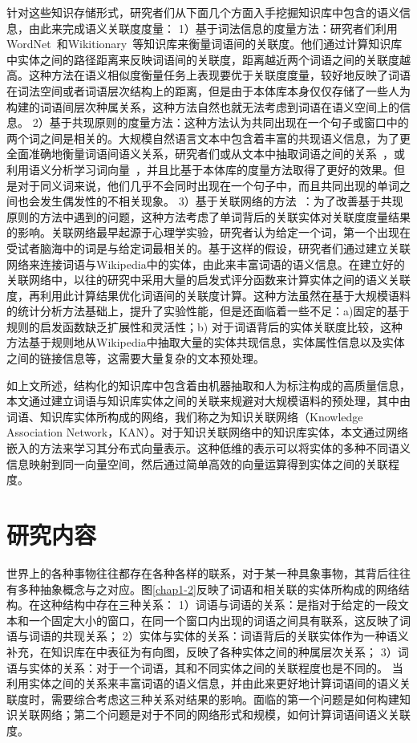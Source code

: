 针对这些知识存储形式，研究者们从下面几个方面入手挖掘知识库中包含的语义信息，由此来完成语义关联度度量：
%
1）基于词法信息的度量方法：研究者们利用WordNet~\cite{acl/Pucher07, tkde/ZhuI17}和Wikitionary~\cite{aaai/ZeschMG08}等知识库来衡量词语间的关联度。他们通过计算知识库中实体之间的路径距离来反映词语间的关联度，距离越近两个词语之间的关联度越高。这种方法在语义相似度衡量任务上表现要优于关联度度量，较好地反映了词语在词法空间或者词语层次结构上的距离，但是由于本体库本身仅仅存储了一些人为构建的词语间层次种属关系，这种方法自然也就无法考虑到词语在语义空间上的信息。
%
2）基于共现原则的度量方法：这种方法认为共同出现在一个句子或窗口中的两个词之间是相关的。大规模自然语言文本中包含着丰富的共现语义信息，为了更全面准确地衡量词语间语义关系，研究者们或从文本中抽取词语之间的关系~\cite{aaai/Milne08}，或利用语义分析学习词向量~\cite{ijcai/GabrilovichM07, corr/Mikolov13, emnlp/PenningtonSM14}，并且比基于本体库的度量方法取得了更好的效果。但是对于同义词来说，他们几乎不会同时出现在一个句子中，而且共同出现的单词之间也会发生偶发性的不相关现象。
%
3）基于关联网络的方法~\cite{aaai/ZhangZH15, aaai/GongXH18}：为了改善基于共现原则的方法中遇到的问题，这种方法考虑了单词背后的关联实体对关联度度量结果的影响。关联网络最早起源于心理学实验，研究者认为给定一个词，第一个出现在受试者脑海中的词是与给定词最相关的。基于这样的假设，研究者们通过建立关联网络来连接词语与Wikipedia中的实体，由此来丰富词语的语义信息。在建立好的关联网络中，以往的研究中采用大量的启发式评分函数来计算实体之间的语义关联度，再利用此计算结果优化词语间的关联度计算。这种方法虽然在基于大规模语料的统计分析方法基础上，提升了实验性能，但是还面临着一些不足：a)固定的基于规则的启发函数缺乏扩展性和灵活性；b) 对于词语背后的实体关联度比较，这种方法基于规则地从Wikipedia中抽取大量的实体共现信息，实体属性信息以及实体之间的链接信息等，这需要大量复杂的文本预处理。

如上文所述，结构化的知识库中包含着由机器抽取和人为标注构成的高质量信息，本文通过建立词语与知识库实体之间的关联来规避对大规模语料的预处理，其中由词语、知识库实体所构成的网络，我们称之为知识关联网络（Knowledge Association Network，KAN）。对于知识关联网络中的知识库实体，本文通过网络嵌入的方法来学习其分布式向量表示。这种低维的表示可以将实体的多种不同语义信息映射到同一向量空间，然后通过简单高效的向量运算得到实体之间的关联程度。


\section{研究内容}
世界上的各种事物往往都存在各种各样的联系，对于某一种具象事物，其背后往往有多种抽象概念与之对应。图\ref{chap1-2}反映了词语和相关联的实体所构成的网络结构。在这种结构中存在三种关系：
%
1）词语与词语的关系：是指对于给定的一段文本和一个固定大小的窗口，在同一个窗口内出现的词语之间具有联系，这反映了词语与词语的共现关系；
2）实体与实体的关系：词语背后的关联实体作为一种语义补充，在知识库在中表征为有向图，反映了各种实体之间的种属层次关系；
3）词语与实体的关系：对于一个词语，其和不同实体之间的关联程度也是不同的。
%
当利用实体之间的关系来丰富词语的语义信息，并由此来更好地计算词语间的语义关联度时，需要综合考虑这三种关系对结果的影响。面临的第一个问题是如何构建知识关联网络；第二个问题是对于不同的网络形式和规模，如何计算词语间语义关联度。

